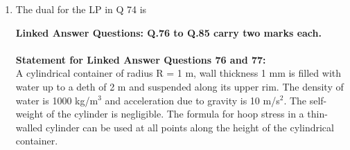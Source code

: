 \documentclass[journal,12pt,onecolumn]{IEEEtran}
\begin{document}
\begin{enumerate}
    \item The dual for the LP in Q 74 is\\

          \begin{enumerate}
          \end{enumerate}

          \large\textbf{Linked Answer Questions: Q.76 to Q.85 carry two marks each.}\\\\
          \normalsize\textbf{Statement for Linked Answer Questions 76 and 77:}\\

          A cylindrical container of radius R = 1 m, wall thickness 1 mm is filled with water up to a deth of 2 m and suspended along its upper rim. The density of water is 1000 kg/m$^3$ and acceleration due to gravity is 10 m/s$^2$. The self-weight of the cylinder is negligible. The formula for hoop stress in a thin-walled cylinder can be used at all points along the height of the cylindrical container.


\end{enumerate}
\end{document}
